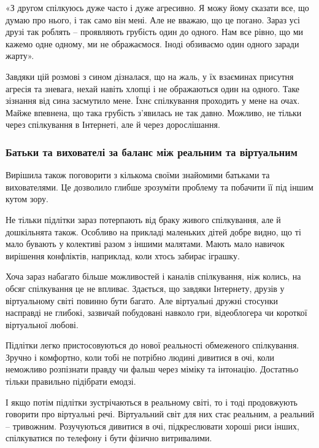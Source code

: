 \begin{zznagolos}
«З другом спілкуюсь дуже часто і дуже агресивно. Я можу йому сказати все, що
думаю про нього, і так само він мені. Але не вважаю, що це погано. Зараз усі
друзі так роблять – проявляють грубість один до одного. Нам все рівно, що ми
кажемо одне одному, ми не ображаємося. Іноді обзиваємо один одного заради
жарту».
\end{zznagolos}

Завдяки цій розмові з сином дізналася, що на жаль, у їх взаєминах присутня
агресія та зневага, нехай навіть хлопці і не ображаються один на одного. Таке
зізнання від сина засмутило мене. Їхнє спілкування проходить у мене на очах.
Майже впевнена, що така грубість з’явилась не так давно. Можливо, не тільки
через спілкування в Інтернеті, але й через дорослішання.

\subsubsection{Батьки та вихователі за баланс між реальним та віртуальним}

Вирішила також поговорити з кількома своїми знайомими батьками та вихователями.
Це дозволило глибше зрозуміти проблему та побачити її під іншим кутом зору.

Не тільки підлітки зараз потерпають від браку живого спілкування, але й
дошкільнята також. Особливо на прикладі маленьких дітей добре видно, що ті мало
бувають у колективі разом з іншими малятами. Мають мало навичок вирішення
конфліктів, наприклад, коли хтось забирає іграшку.

Хоча зараз набагато більше можливостей і каналів спілкування, ніж колись, на
обсяг спілкування це не впливає. Здається, що завдяки Інтернету, друзів у
віртуальному світі повинно бути багато. Але віртуальні дружні стосунки
насправді не глибокі, зазвичай побудовані навколо гри, відеоблогера чи короткої
віртуальної любові.

Підлітки легко пристосовуються до нової реальності обмеженого спілкування.
Зручно і комфортно, коли тобі не потрібно людині дивитися в очі, коли неможливо
розпізнати правду чи фальш через міміку та інтонацію. Достатньо тільки
правильно підібрати емодзі.

І якщо потім підлітки зустрічаються в реальному світі, то і тоді продовжують
говорити про віртуальні речі. Віртуальний світ для них стає реальним, а
реальний – тривожним. Розучуються дивитися в очі, підкреслювати хороші риси
інших, спілкуватися по телефону і бути фізично витривалими.

